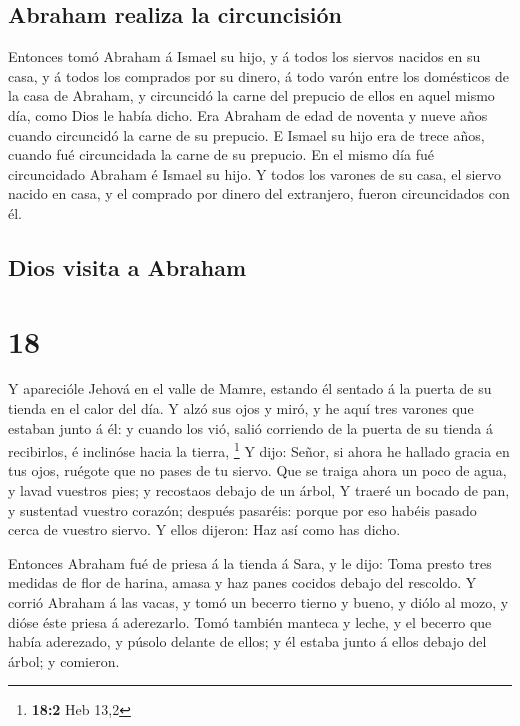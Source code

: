 \hypertarget{abraham-realiza-la-circuncisiuxf3n}{%
\subsection{Abraham realiza la
circuncisión}\label{abraham-realiza-la-circuncisiuxf3n}}

 Entonces tomó Abraham á Ismael su hijo, y á todos los
siervos nacidos en su casa, y á todos los comprados por su dinero, á
todo varón entre los domésticos de la casa de Abraham, y circuncidó la
carne del prepucio de ellos en aquel mismo día, como Dios le había
dicho.  Era Abraham de edad de noventa y nueve años
cuando circuncidó la carne de su prepucio.  E Ismael su
hijo era de trece años, cuando fué circuncidada la carne de su prepucio.
 En el mismo día fué circuncidado Abraham é Ismael su
hijo.  Y todos los varones de su casa, el siervo nacido
en casa, y el comprado por dinero del extranjero, fueron circuncidados
con él.

\hypertarget{dios-visita-a-abraham}{%
\subsection{Dios visita a Abraham}\label{dios-visita-a-abraham}}

\hypertarget{section-17}{%
\section{18}\label{section-17}}

 Y aparecióle Jehová en el valle de Mamre, estando él
sentado á la puerta de su tienda en el calor del día.  Y
alzó sus ojos y miró, y he aquí tres varones que estaban junto á él: y
cuando los vió, salió corriendo de la puerta de su tienda á recibirlos,
é inclinóse hacia la tierra, \footnote{\textbf{18:2} Heb 13,2}
 Y dijo: Señor, si ahora he hallado gracia en tus ojos,
ruégote que no pases de tu siervo.  Que se traiga ahora un
poco de agua, y lavad vuestros pies; y recostaos debajo de un árbol,
 Y traeré un bocado de pan, y sustentad vuestro corazón;
después pasaréis: porque por eso habéis pasado cerca de vuestro siervo.
Y ellos dijeron: Haz así como has dicho.

 Entonces Abraham fué de priesa á la tienda á Sara, y le
dijo: Toma presto tres medidas de flor de harina, amasa y haz panes
cocidos debajo del rescoldo.  Y corrió Abraham á las
vacas, y tomó un becerro tierno y bueno, y diólo al mozo, y dióse éste
priesa á aderezarlo.  Tomó también manteca y leche, y el
becerro que había aderezado, y púsolo delante de ellos; y él estaba
junto á ellos debajo del árbol; y comieron.

